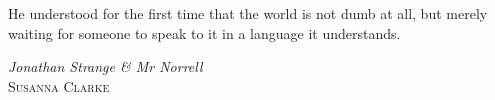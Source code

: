 \cleardoublepage
\thispagestyle{plain}
\epigraph{He understood for the first time that the world is not dumb at all, but merely waiting for someone to speak to it in a language it understands.}
{\emph{Jonathan Strange \& Mr Norrell} \\ \textsc{Susanna Clarke}}